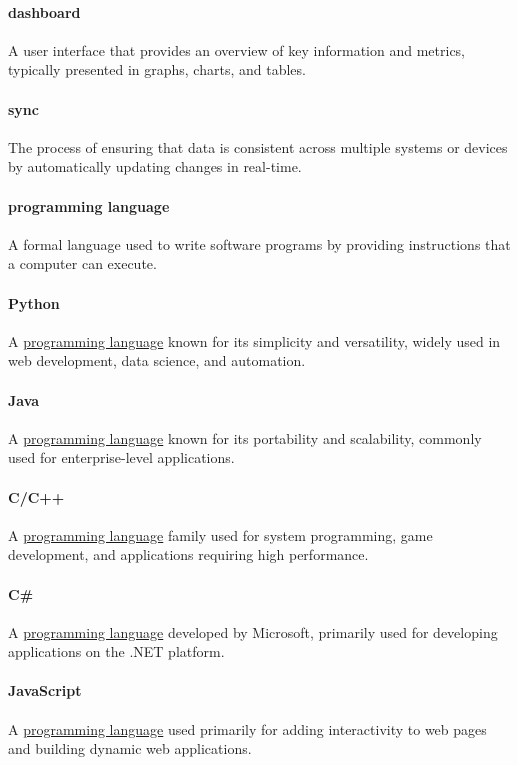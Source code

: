 \documentclass[12pt]{article}
\begin{document}
\paragraph*{dashboard}
A user interface that provides an overview of key information and
metrics, typically presented in graphs, charts, and tables.

\paragraph*{sync}
The process of ensuring that data is consistent across multiple
systems or devices by automatically updating changes in real-time.

\paragraph*{programming language}
\label{term:progl}
A formal language used to write software programs by providing
instructions that a computer can execute.

\paragraph*{Python}
\label{term:python}
A \hyperref[term:progl]{programming language} known for its
simplicity and versatility, widely used in web development, data
science, and automation.

\paragraph*{Java}
A \hyperref[term:progl]{programming language} known for its
portability and scalability, commonly used for enterprise-level applications.

\paragraph*{C/C++}
A \hyperref[term:progl]{programming language} family used for system
programming, game development, and applications requiring high performance.

\paragraph*{C\#}
A \hyperref[term:progl]{programming language} developed by Microsoft,
primarily used for developing applications on the .NET platform.

\paragraph*{JavaScript}
\label{term:JS}
A \hyperref[term:progl]{programming language} used primarily for
adding interactivity to web pages and building dynamic web applications.
\end{document}

